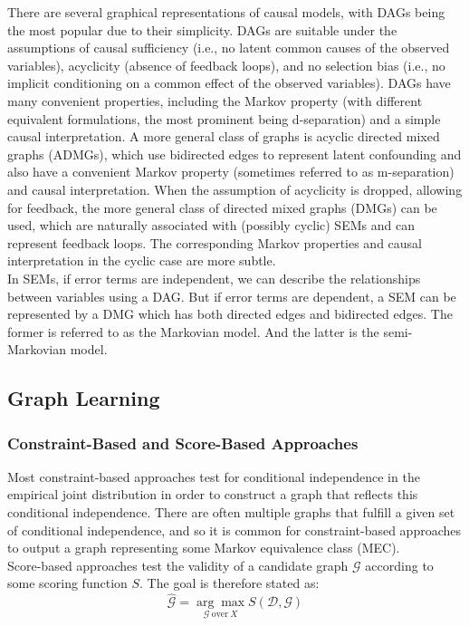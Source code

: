 \documentclass[10pt]{article}
\begin{document}
There are several graphical representations of causal models, with DAGs being the most popular due to their simplicity. DAGs are suitable under the assumptions of causal sufficiency (i.e., no latent common causes of the observed variables), acyclicity (absence of feedback loops), and no selection bias (i.e., no implicit conditioning on a common effect of the observed variables). DAGs have many convenient properties, including the Markov property (with different equivalent formulations, the most prominent being d-separation) and a simple causal interpretation. A more general class of graphs is acyclic directed mixed graphs (ADMGs), which use bidirected edges to represent latent confounding and also have a convenient Markov property (sometimes referred to as m-separation) and causal interpretation. When the assumption of acyclicity is dropped, allowing for feedback, the more general class of directed mixed graphs (DMGs) can be used, which are naturally associated with (possibly cyclic) SEMs and can represent feedback loops. The corresponding Markov properties and causal interpretation in the cyclic case are more subtle\cite{Bongers_2021}.\\

In SEMs, if error terms are independent, we can describe the relationships between variables using a DAG. But if error terms are dependent, a SEM can be represented by a DMG which has both directed edges and bidirected edges. The former is referred to as the Markovian model. And the latter is the semi-Markovian model\cite{Shipster2006semimarkovian}.

\subsection{Graph Learning}

\subsubsection{Constraint-Based and Score-Based Approaches}

Most constraint-based approaches test for conditional independence in the empirical joint distribution in order to construct a graph that reflects this conditional independence. There are often multiple graphs that fulfill a given set of conditional independence, and so it is common for constraint-based approaches to output a graph representing some Markov equivalence class (MEC).\\

Score-based approaches test the validity of a candidate graph $\mathcal{G}$ according to some scoring function $S$. The goal is therefore stated as\cite{peters}:
\begin{equation}
    \hat{\mathcal{G}} = \underset{\mathcal{G} \ \text {over} \ X}{\arg\max} S(\mathcal{D}, \mathcal{G})
\end{equation}
\end{document}
